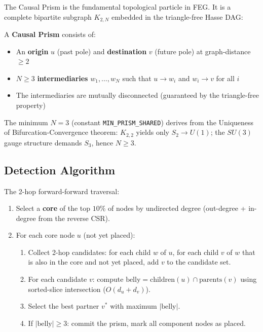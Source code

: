 \documentclass[11pt, a4paper, openany]{book}
\newcommand{\code}[1]{\texttt{#1}}
\newcounter{thm}[chapter]
\begin{document}
The Causal Prism is the fundamental topological particle in FEG.  It is a
complete bipartite subgraph $K_{2,N}$ embedded in the triangle-free Hasse DAG:

\begin{definition}
  A \textbf{Causal Prism} consists of:
  \begin{itemize}
    \item An \textbf{origin} $u$ (past pole) and \textbf{destination} $v$ (future pole)
          at graph-distance $\geq 2$
    \item $N \geq 3$ \textbf{intermediaries} $w_1, \ldots, w_N$ such that
          $u \to w_i$ and $w_i \to v$ for all $i$
    \item The intermediaries are mutually disconnected
          (guaranteed by the triangle-free property)
  \end{itemize}
  The minimum $N = 3$ (constant \code{MIN\_PRISM\_SHARED}) derives from
  the Uniqueness of Bifurcation-Convergence theorem: $K_{2,2}$ yields only
  $S_2 \to U(1)$; the $SU(3)$ gauge structure demands $S_3$, hence $N \geq 3$.
\end{definition}

\subsection{Detection Algorithm}

The 2-hop forward-forward traversal:

\begin{enumerate}
  \item Select a \textbf{core} of the top $10\%$ of nodes by undirected degree
        (out-degree + in-degree from the reverse CSR).
  \item For each core node $u$ (not yet placed):
    \begin{enumerate}
      \item Collect 2-hop candidates: for each child $w$ of $u$, for each child
            $v$ of $w$ that is also in the core and not yet placed, add $v$ to
            the candidate set.
      \item For each candidate $v$: compute
            $\text{belly} = \text{children}(u) \cap \text{parents}(v)$ using
            sorted-slice intersection ($O(d_u + d_v)$).
      \item Select the best partner $v^*$ with maximum $|\text{belly}|$.
      \item If $|\text{belly}| \geq 3$: commit the prism, mark all component
            nodes as placed.
    \end{enumerate}
\end{enumerate}
\end{document}
